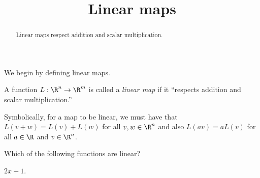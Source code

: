 \documentclass{ximera}
\title{Linear maps}
\begin{document}
\begin{abstract}
  Linear maps respect addition and scalar multiplication.
\end{abstract}

We begin by defining linear maps.

\begin{definition}
  A function $L: \R^n \to \R^m$ is called a \textit{linear map} if it
  ``respects addition and scalar multiplication.''

  Symbolically, for a map to be linear, we must have that $L(v+w) =
  L(v)+L(w)$ for all $v,w \in \R^n$ and also $L(av) = a L(v)$ for all
  $a \in \R$ and $v\in \R^n$.
\end{definition}

\begin{question}
  Which of the following functions are linear?
  \begin{solution}
    \begin{hint}
      $2x + 1$.
    \end{hint}
	

\end{solution}
\end{question}
\end{document}
